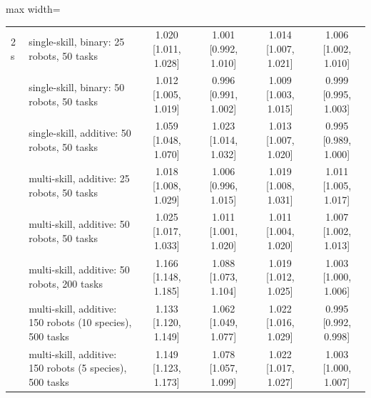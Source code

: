 \begin{table}[h]
\begin{adjustbox}{max width=\textwidth}
\begin{tabular}{llcccc}
\midrule
2\,s & single-skill, binary: 25 robots, 50 tasks & 1.020 {\scriptsize [1.011, 1.028]} & 1.001 {\scriptsize [0.992, 1.010]} & 1.014 {\scriptsize [1.007, 1.021]} & 1.006 {\scriptsize [1.002, 1.010]} \\
 & single-skill, binary: 50 robots, 50 tasks & 1.012 {\scriptsize [1.005, 1.019]} & 0.996 {\scriptsize [0.991, 1.002]} & 1.009 {\scriptsize [1.003, 1.015]} & 0.999 {\scriptsize [0.995, 1.003]} \\
 & single-skill, additive: 50 robots, 50 tasks & 1.059 {\scriptsize [1.048, 1.070]} & 1.023 {\scriptsize [1.014, 1.032]} & 1.013 {\scriptsize [1.007, 1.020]} & 0.995 {\scriptsize [0.989, 1.000]} \\
 & multi-skill, additive: 25 robots, 50 tasks & 1.018 {\scriptsize [1.008, 1.029]} & 1.006 {\scriptsize [0.996, 1.015]} & 1.019 {\scriptsize [1.008, 1.031]} & 1.011 {\scriptsize [1.005, 1.017]} \\
 & multi-skill, additive: 50 robots, 50 tasks & 1.025 {\scriptsize [1.017, 1.033]} & 1.011 {\scriptsize [1.001, 1.020]} & 1.011 {\scriptsize [1.004, 1.020]} & 1.007 {\scriptsize [1.002, 1.013]} \\
 & multi-skill, additive: 50 robots, 200 tasks & 1.166 {\scriptsize [1.148, 1.185]} & 1.088 {\scriptsize [1.073, 1.104]} & 1.019 {\scriptsize [1.012, 1.025]} & 1.003 {\scriptsize [1.000, 1.006]} \\
 & multi-skill, additive: 150 robots (10 species), 500 tasks & 1.133 {\scriptsize [1.120, 1.149]} & 1.062 {\scriptsize [1.049, 1.077]} & 1.022 {\scriptsize [1.016, 1.029]} & 0.995 {\scriptsize [0.992, 0.998]} \\
 & multi-skill, additive: 150 robots (5 species), 500 tasks & 1.149 {\scriptsize [1.123, 1.173]} & 1.078 {\scriptsize [1.057, 1.099]} & 1.022 {\scriptsize [1.017, 1.027]} & 1.003 {\scriptsize [1.000, 1.007]} \\
\bottomrule
\end{tabular}\end{adjustbox}
\end{table}
